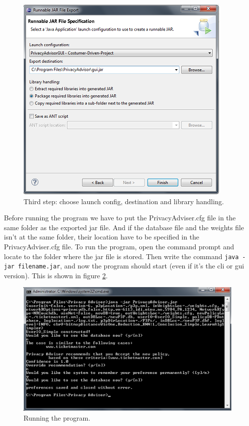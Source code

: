   \begin{figure}
\begin{centering}
    \includegraphics{Documentation/export_last.png}
    \caption{Third step: choose launch config, destination and library handling.}
    \label{exportLastStep}
\end{centering}
  \end{figure}


Before running the program we have to put the PrivacyAdviser.cfg file in the same folder as the exported jar file. And if the database file and the weights file isn't at the same folder, their location have to be specified in the PrivacyAdviser.cfg file. To run the program, open the command prompt and locate to the folder where the jar file is stored. Then write the command \texttt{java -jar filename.jar}, and now the program should start (even if it's the cli or gui version). This is shown in figure \ref{runProgram}.



  \begin{figure}
  \begin{centering}
    \includegraphics{Documentation/cli.png}
    \caption{Running the program.}
    \label{runProgram}
    \end{centering}
  \end{figure}


